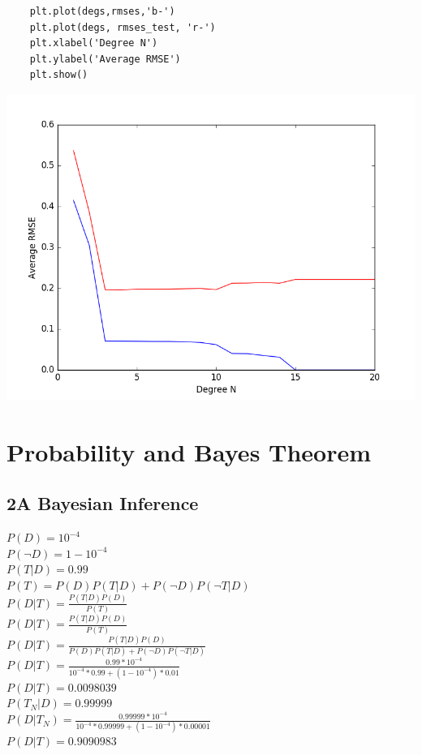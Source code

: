 \documentclass[12pt]{article}
\begin{document}
\begin{flushleft}
\begin{lstlisting}
	plt.plot(degs,rmses,'b-')
	plt.plot(degs, rmses_test, 'r-')
	plt.xlabel('Degree N')
	plt.ylabel('Average RMSE')
	plt.show()

\end{lstlisting}
		\includegraphics[scale=0.5]{HW1_1G.png}
		\label{fig:graph 1G}
		\section*{Probability and Bayes Theorem}
		
		\subsection*{2A Bayesian Inference}
		$P(D) = 10^{-4}$\\
		$P(\neg D) = 1 - 10^{-4}$\\
		$P(T|D) = 0.99$\\
		$P(T) = P(D)P(T|D) + P(\neg D) P(\neg T|D)$\\
		$P(D|T) = \frac{P(T|D) P(D)}{P(T)}$\\
		$P(D|T) = \frac{P(T|D) P(D)}{P(T)}$\\
		
		$P(D|T) = \frac{P(T|D) P(D)}{P(D)P(T|D) + P(\neg D) P(\neg T|D)}$\\
		
		$P(D|T) = \frac{0.99 * 10^{-4}}{10^{-4} * 0.99 + (1 - 10^{-4}) * 0.01}$\\
		$P(D|T) = 0.0098039$\\
		
		$P(T_N|D) = 0.99999$\\
		$P(D|T_N) = \frac{0.99999 * 10^{-4}}{10^{-4} * 0.99999 + (1 - 10^{-4}) * 0.00001}$\\
		$P(D|T) = 0.9090983$\\
		

\end{flushleft}
\end{document}
